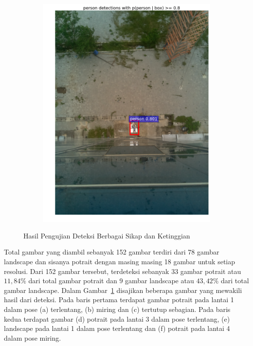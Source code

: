 \begin{figure}[ht]
\begin{subfigure}[b]{0.27\textwidth}
    \caption{}
  \end{subfigure}             
  \begin{subfigure}[b]{0.27\textwidth}
    \includegraphics[width=\textwidth]{6}
    \caption{}
  \end{subfigure}
  \caption{Hasil Pengujian Deteksi Berbagai Sikap dan Ketinggian }
  \label{fig:korban_bencana_tinggi}
\end{figure}

Total gambar yang diambil sebanyak 152 gambar terdiri dari 78 gambar landscape dan sisanya potrait dengan masing masing 18 gambar untuk setiap resolusi. Dari 152 gambar tersebut, terdeteksi sebanyak 33 gambar potrait atau $11,84\%$ dari total gambar potrait dan 9 gambar landscape atau $43,42\%$ dari total gambar landscape. Dalam Gambar~\ref{fig:korban_bencana_tinggi} disajikan beberapa gambar yang mewakili hasil dari deteksi. Pada baris pertama terdapat gambar potrait pada lantai 1 dalam pose (a) terlentang, (b) miring dan (c) tertutup sebagian. Pada baris kedua terdapat gambar (d) potrait pada lantai 3 dalam pose terlentang, (e) landscape pada lantai 1 dalam pose terlentang dan (f) potrait pada lantai 4 dalam pose miring.

